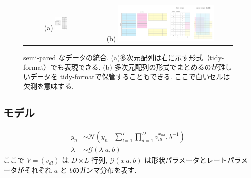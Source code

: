 \documentclass[a4paper,12ptc]{jsarticle} %
\newcommand{\normal}{\mathcal{N}}
\newcommand{\gam}{\mathcal{G}}
\begin{document}
\begin{figure}
    \centering
    \begin{tabular}{c|c}
    \footnotesize (a)
    \includegraphics[width=0.2\textwidth]{img/threeway.pdf} &
    \footnotesize (b)
    \includegraphics[width=0.7\textwidth]{img/mosaic.pdf} 
    \end{tabular}
    \caption{semi-pared なデータの統合. (a)多次元配列は右に示す形式（tidy-format）でも表現できる.  (b) 多次元配列の形式でまとめるのが難しいデータを tidy-formatで保管することもできる. ここで白いセルは欠測を意味する.}
    \label{fig_mosaic}
\end{figure}

\subsection{モデル}

\begin{align}
y_n &\sim \normal\left(y_n \mid \sum_{l=1}^L \prod_{d=1}^D v_{dl}^{x_{nd}}, \lambda^{-1}\right) \label{eq_mod1}\\
\lambda & \sim \gam(\lambda | a,b) \nonumber
\end{align}
ここで $V=(v_{dl})$ は $D \times L$  行列, $\gam(x|a,b)$ は形状パラメータとレートパラメータがそれぞれ $a$ と $b$のガンマ分布を表す.
\end{document}
